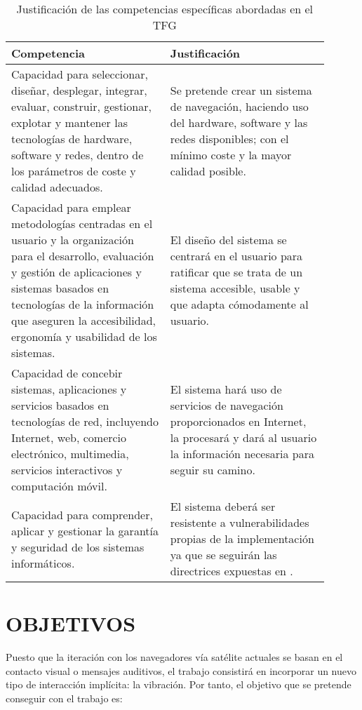 \documentclass{pre-tfg}
\begin{document}
\begin{spacing}{1.1}
\begin{longtable}{p{0.45\linewidth}p{0.45\linewidth}}
  \caption{Justificación de las competencias específicas abordadas en el TFG}
  \label{tab:competencias} \\

  \textbf{Competencia} & \textbf{Justificación} \\
  \hline
  \hline
    Capacidad para seleccionar, diseñar, desplegar, integrar, evaluar, construir, gestionar, explotar y mantener las tecnologías de hardware, software y redes, dentro de los parámetros de coste y calidad adecuados. & Se pretende crear un sistema de navegación, haciendo uso del hardware, software y las redes disponibles; con el mínimo coste y la mayor calidad posible.\\

    Capacidad para emplear metodologías centradas en el usuario y la organización para el desarrollo, evaluación y gestión de aplicaciones y sistemas basados en tecnologías de la información que aseguren la accesibilidad, ergonomía y usabilidad de los sistemas. & El diseño del sistema se centrará en el usuario para ratificar que se trata de un sistema accesible, usable y que adapta cómodamente al usuario.\\

    Capacidad de concebir sistemas, aplicaciones y servicios basados en tecnologías de red, incluyendo Internet, web, comercio electrónico, multimedia, servicios interactivos y computación móvil. & El sistema hará uso de servicios de navegación proporcionados en Internet, la procesará y dará al usuario la información necesaria para seguir su camino.\\

    Capacidad para comprender, aplicar y gestionar la garantía y seguridad de los sistemas informáticos. & El sistema deberá ser resistente a vulnerabilidades propias de la implementación ya que se seguirán las directrices expuestas en \cite{Moreno13}.\\

  \hline
\end{longtable}
\end{spacing}

\section{OBJETIVOS}

Puesto que la iteración con los navegadores vía satélite actuales se basan en el contacto
visual o mensajes auditivos, el trabajo consistirá en incorporar un nuevo tipo de
interacción implícita: la vibración. Por tanto, el objetivo que se pretende conseguir con
el trabajo es:
\end{document}
